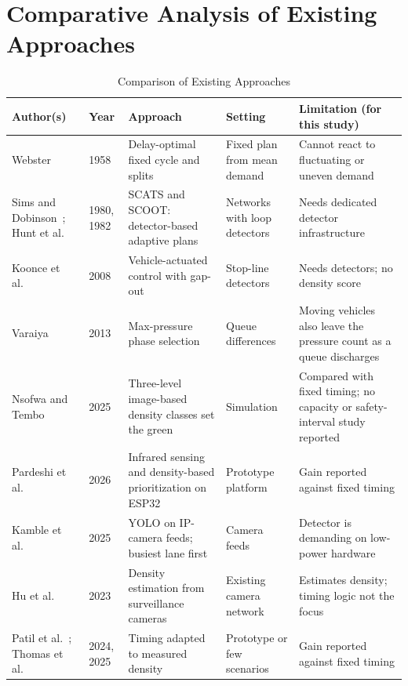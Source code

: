 \section{Comparative Analysis of Existing Approaches}

\begin{table}[H]
\centering
\caption{Comparison of Existing Approaches}
\label{tab:litreview}
\small
\begin{tabular}{@{}p{3.3cm}p{1.1cm}p{3.6cm}p{3.1cm}p{3.6cm}@{}}
\toprule
\textbf{Author(s)} & \textbf{Year} & \textbf{Approach} & \textbf{Setting} & \textbf{Limitation (for this study)} \\
\midrule
Webster~\cite{ref2} & 1958 & Delay-optimal fixed cycle and splits & Fixed plan from mean demand & Cannot react to fluctuating or uneven demand \\
Sims and Dobinson~\cite{ref3}; Hunt et al.~\cite{ref4} & 1980, 1982 & SCATS and SCOOT: detector-based adaptive plans & Networks with loop detectors & Needs dedicated detector infrastructure \\
Koonce et al.~\cite{ref23} & 2008 & Vehicle-actuated control with gap-out & Stop-line detectors & Needs detectors; no density score \\
Varaiya~\cite{ref11} & 2013 & Max-pressure phase selection & Queue differences & Moving vehicles also leave the pressure count as a queue discharges \\
Nsofwa and Tembo~\cite{ref1} & 2025 & Three-level image-based density classes set the green & Simulation & Compared with fixed timing; no capacity or safety-interval study reported \\
Pardeshi et al.~\cite{ref5} & 2026 & Infrared sensing and density-based prioritization on ESP32 & Prototype platform & Gain reported against fixed timing \\
Kamble et al.~\cite{ref6} & 2025 & YOLO on IP-camera feeds; busiest lane first & Camera feeds & Detector is demanding on low-power hardware \\
Hu et al.~\cite{ref8} & 2023 & Density estimation from surveillance cameras & Existing camera network & Estimates density; timing logic not the focus \\
Patil et al.~\cite{ref9}; Thomas et al.~\cite{ref10} & 2024, 2025 & Timing adapted to measured density & Prototype or few scenarios & Gain reported against fixed timing \\
\bottomrule
\end{tabular}
\end{table}

